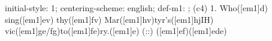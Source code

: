 initial-style: 1;
centering-scheme: english;
def-m1: \grealign;
(c4) 1. Who([em1]d) sing([em1]ev) thy([em1]fv) Mar([em1]hv)tyr's([em1]hjIH) vic([em1]ge/fg)to([em1]fe)ry.([em1]e) (::) ([em1]ef)([em1]ede)